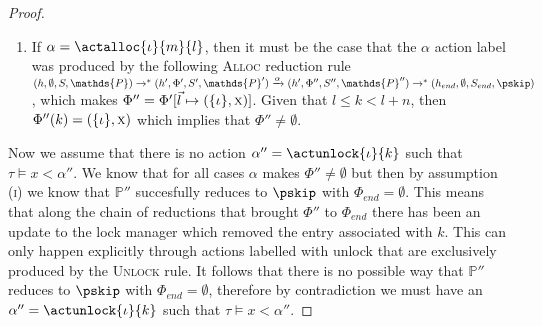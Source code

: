 \begin{lem}
\begin{proof}
\begin{enumerate}
		\item If $\alpha = \actalloc{\iota}{m}{l}$, then it must be the case that the $\alpha$ action label was produced by the following \textsc{Alloc} reduction rule $(h, \emptyset, S, \mathds{P}) \rightarrow^* (h', \Phi', S', \mathds{P}') \xrightarrow{\alpha} (h', \Phi'', S'', \mathds{P}'') \rightarrow^* (h_{end}, \emptyset, S_{end}, \pskip)$, which makes $\Phi'' = \Phi'[\vec{l} \mapsto (\{\iota\}, \textsc{x})]$. Given that $l \leq k < l + n$, then $\Phi''(k) = (\{\iota\}, \textsc{x})$ which implies that $\Phi'' \neq \emptyset$.
	\end{enumerate}
	
	Now we assume that there is no action $\alpha'' = \actunlock{\iota}{k}$ such that $\tau \vDash x < \alpha''$. We know that for all cases $\alpha$ makes $\Phi'' \neq \emptyset$ but then by assumption (\textsc{i}) we know that $\mathds{P}''$ succesfully reduces to $\pskip$ with $\Phi_{end} = \emptyset$. This means that along the chain of reductions that brought $\Phi''$ to $\Phi_{end}$ there has been an update to the lock manager which removed the entry associated with $k$. This can only happen explicitly through actions labelled with \textsf{unlock} that are exclusively produced by the \textsc{Unlock} rule. It follows that there is no possible way that $\mathds{P}''$ reduces to $\pskip$ with $\Phi_{end} = \emptyset$, therefore by contradiction we must have an $\alpha'' = \actunlock{\iota}{k}$ such that $\tau \vDash x < \alpha''$.
	\end{proof}
\end{lem}

